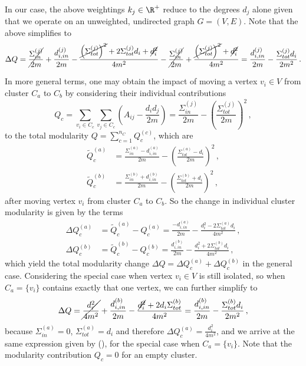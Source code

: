 \documentclass[12pt, a4paper]{article}
\begin{document}
  In our case, the above weightings $k_j \in \R^+$ reduce to the degrees $d_j$ alone given that we operate on an unweighted, undirected graph $G = (V, E)$. Note that the above  simplifies to
  \begin{equation}
    \Delta Q = \cancel{\frac{\Sigma_{in}^{(j)}}{2m}} + \frac{d_{i, in}^{(j)}}{2m} - \frac{\cancel{\left(\Sigma_{tot}^{(j)}\right)^2} + 2 \Sigma_{tot}^{(j)} d_i + \cancel{d_i^2}}{4m^2} - \cancel{\frac{\Sigma_{in}^{(j)}}{2m}} + \frac{\cancel{\left(\Sigma_{tot}^{(j)}\right)^2} + \cancel{d_i^2}}{4m^2} = \frac{d_{i, in}^{(j)}}{2m} - \frac{\Sigma_{tot}^{(j)} d_i}{2m^2} \,.
    \label{eq:blondel-deltaQ-simplified}
  \end{equation}

  In more general terms, one may obtain the impact of moving a vertex $v_i \in V$ from cluster $C_a$ to $C_b$ by considering their individual contributions
  $$Q_c = \sum_{v_i \in C_c} \sum_{v_j \in C_c} \left(A_{ij} - \frac{d_i d_j}{2m}\right) = \frac{\Sigma_{in}^{(j)}}{2m} - \left(\frac{\Sigma_{tot}^{(j)}}{2m}\right)^2\,,$$
  to the total modularity $Q = \sum_{c=1}^{n_C} Q_c^{(c)}$, which are
  \begin{align*}
    \tilde{Q}_c^{(a)} & = \frac{\Sigma_{in}^{(a)} - d_{i, in}^{(a)}}{2m} - \left(\frac{\Sigma_{tot}^{(a)} - d_i}{2m}\right)^2\,, \\
    \tilde{Q}_c^{(b)} & = \frac{\Sigma_{in}^{(b)} + d_{i, in}^{(b)}}{2m} - \left(\frac{\Sigma_{tot}^{(b)} + d_i}{2m}\right)^2\,,
  \end{align*}
  after moving vertex $v_i$ from cluster $C_a$ to $C_b$.
  So the change in individual cluster modularity is given by the terms
  \begin{align*}
    \Delta Q_c^{(a)} & = \tilde{Q}_c^{(a)} - Q_c^{(a)} = \frac{-d_{i, in}^{(a)}}{2m} - \frac{d_i^2 - 2 \Sigma_{tot}^{(a)} d_i}{4m^2}\,, \\
    \Delta Q_c^{(b)} & = \tilde{Q}_c^{(b)} - Q_c^{(b)} = \frac{d_{i, in}^{(b)}}{2m} - \frac{d_i^2 + 2 \Sigma_{tot}^{(b)} d_i}{4m^2}\,,
  \end{align*}
  which yield the total modularity change $\Delta Q = \Delta Q_c^{(a)} + \Delta Q_c^{(b)}$ in the general case.
  Considering the special case when vertex $v_i \in V$ is still isolated, so when $C_a = \{v_i\}$ contains exactly that one vertex, we can further simplify to
  $$\Delta Q = \cancel{\frac{d_i^2}{4m^2}} + \frac{d_{i,in}^{(b)}}{2m} - \frac{\cancel{d_i^2} + 2 d_i \Sigma_{tot}^{(b)}}{4m^2} = \frac{d_{i,in}^{(b)}}{2m} - \frac{\Sigma_{tot}^{(b)} d_i}{2m^2} \,,$$
  because $\Sigma_{in}^{(a)} = 0$, $\Sigma_{tot}^{(a)} = d_i$ and therefore $\Delta Q_c^{(a)} = \frac{d_i^2}{4m^2}$, and we arrive at the same expression given by \cite{lambiotte-louvain-clustering} (), for the special case when $C_a = \{v_i\}$.
  Note that the modularity contribution $Q_c = 0$ for an empty cluster.
\end{document}
